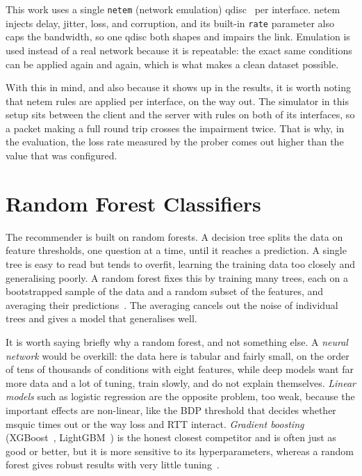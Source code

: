 This work uses a single \texttt{netem} (network emulation)
qdisc~\cite{hemminger2005netem} per interface. netem injects delay, jitter,
loss, and corruption, and its built-in \texttt{rate} parameter also caps the
bandwidth, so one qdisc both shapes and impairs the link. Emulation is used
instead of a real network because it is repeatable: the exact same conditions
can be applied again and again, which is what makes a clean dataset possible.

With this in mind, and also because it shows up in the results, it is worth noting that
netem rules are applied per interface, on the way out. The simulator in this
setup sits between the client and the server with rules on both of its
interfaces, so a packet making a full round trip crosses the impairment twice.
That is why, in the evaluation, the loss rate measured by the prober comes out
higher than the value that was configured.

\section{Random Forest Classifiers}
\label{sec:bg-random-forest}

The recommender is built on random forests. A decision tree splits the data on
feature thresholds, one question at a time, until it reaches a prediction. A
single tree is easy to read but tends to overfit, learning the training data
too closely and generalising poorly. A random forest fixes this by training
many trees, each on a bootstrapped sample of the data and a random subset of
the features, and averaging their predictions~\cite{breiman2001random}. The
averaging cancels out the noise of individual trees and gives a model that
generalises well.

It is worth saying briefly why a random forest, and not something else. A
\emph{neural network} would be overkill: the data here is tabular and fairly small,
on the order of tens of thousands of conditions with eight features, while
deep models want far more data and a lot of tuning, train slowly, and do not
explain themselves. \emph{Linear models} such as logistic regression are the
opposite problem, too weak, because the important effects are non-linear, like
the BDP threshold that decides whether msquic times out or the way loss and
RTT interact. \emph{Gradient boosting} (XGBoost~\cite{chen2016xgboost},
LightGBM~\cite{ke2017lightgbm}) is the honest closest competitor and is often
just as good or better, but it is more sensitive to its hyperparameters,
whereas a random forest gives robust results with very little
tuning~\cite{probst2019hyperparameters}.

